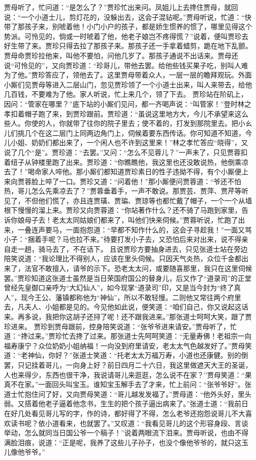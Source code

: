 \documentclass[12pt,oneside]{book}
\begin{document}
贾母听了，忙问道：“是怎么了？”贾珍忙出来问。凤姐儿上去搀住贾母，就回说：“一个小道士儿，剪灯花的，没躲出去，这会子混钻呢。”贾母听说，忙道：“快带了那孩子来，别唬着他！小门小户的孩子，都是娇生惯养的惯了，哪里见得这个势派。可怜见的，倘或一时唬着了他，他老子娘岂不疼得慌？”说着，便叫贾珍去好生带了来。贾珍只得去拉了那孩子来。那孩子还一手拿着蜡剪，跪在地下乱颤。贾母命贾珍拉他来，叫他不要怕，问他几岁了。那孩子通说不出话来。贾母还说“可怜见的”，又向贾珍道：“珍哥儿，带他去罢。给他些钱买果子吃，别叫人难为了他。”贾珍答应了，领他去了。这里贾母带着众人，一层一层的瞻拜观玩。外面小厮们见贾母等进入二层山门，忽见贾珍领了一个小道士出来，叫人来带去，给他几百钱，不要难为了他。家人听说，忙上来几个，领了下去。
贾珍站在阶矶上，因问：“管家在哪里？”底下站的小厮们见问，都一齐喝声说：“叫管家！”登时林之孝扣着帽子跑了来，到贾珍跟前。贾珍道：“虽说这里地方大，今儿不承望来这么些人。你使的人，你就带了往你的院子里去；使不着的，打发到那院里去。把小ㄠ儿们挑几个在这二层门上同两边角门上，伺候着要东西传话。你可知道不知道，今儿小姐、奶奶们都出来了，一个闲人也不许到这里来！”林之孝忙答应“晓得”，又说了几个“是”。贾珍道：“去罢。”又问：“怎么不见蓉儿？”一声未了，只见贾蓉扣着纽子从钟楼里跑了出来。贾珍道：“你瞧瞧他，我这里也还没敢说热，他倒乘凉去了！”喝命家人啐他。那小厮们都知道贾珍素日的性子违拗不得，有个小厮便上来向贾蓉脸上啐了一口。贾珍又道：“问着他！”那小厮便问贾蓉道：“爷还不怕热，哥儿怎么先乘凉去了？”贾蓉垂着手，一声不敢说。那贾芸、贾萍、贾芹等听见了，不但他们慌了，亦且连贾璜、贾㻞、贾琼等也都忙戴了帽子，一个一个从墙根下慢慢的溜上来。贾珍又向贾蓉道：“你站著作什么？还不骑了马跑到家里，告诉你娘母子去！老太太同姑娘们都来了，叫他们快来伺候。”贾蓉听说，忙跑了出来，一叠连声要马，一面抱怨道：“早都不知作什么的，这会子寻趁我！”一面又骂小子：“捆着手呢？马也拉不来。”待要打发小子去，又恐怕后来对出来，说不得亲自走一趟，骑马去了，不在话下。
且说贾珍方要抽身进去，只见张道士站在旁边陪笑说道：“我论理比不得别人，应该在里头伺候。只因天气炎热，众位千金都出来了，法官不敢擅入，请爷的示下。恐老太太问，或要随喜那里，我只在这里伺候罢。”贾珍知道这张道士虽然是当日荣国府国公的替身儿，后又作了“道录司”的正堂曾经先皇御口亲呼为“大幻仙人”，如今现掌“道录司”印，又是当今封为“终了真人”，现今王公、藩镇都称他为“神仙”，所以不敢轻慢。二则他又常往两个府里去，凡夫人、小姐都是见的。今见他如此说，便笑道：“咱们自己，你又说起这话来。再多说，我把你这胡子还挦了呢！还不跟我进来。”那张道士呵呵大笑，跟了贾珍进来。
贾珍到贾母跟前，控身陪笑说道：“张爷爷进来请安。”贾母听了，忙道：“搀过来。”贾珍忙去搀了过来。那张道士先呵呵笑道：“无量寿佛！老祖宗一向福寿康宁？众位奶奶小姐纳福！一向没到府里请安，老太太气色越发好了。”贾母笑道：“老神仙，你好？”张道士笑道：“托老太太万福万寿，小道也还康健。别的倒罢，只记挂着哥儿，一向身上好？前日四月二十六日，我这里做遮天大王的圣诞，人也来得少，东西也很干净，我说请哥儿来逛逛，怎么说不在家？”贾母笑道：“果真不在家。”一面回头叫宝玉。谁知宝玉解手去了才来，忙上前问：“张爷爷好”。张道士忙抱住问了好，又向贾母笑道：“哥儿越发发福了。”贾母道：“他外头好，里头弱。又搭着他老子逼着他念书，生生的把个孩子逼出病来了。”张道士道：“我前日在好几处看见哥儿写的字，作的诗，都好得了不得，怎么老爷还抱怨说哥儿不大喜欢读书呢？依小道看来，也就罢了。”又叹道：“我看见哥儿的这个形容身段、言谈举动，怎么就同当日国公爷一个稿子！”说着两眼流下泪来。贾母听说，也由不得满脸泪痕，说道：“正是呢，我养了这些儿子孙子，也没个像他爷爷的，就只这玉儿像他爷爷。”
\end{document}
